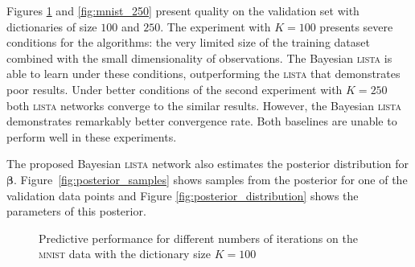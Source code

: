 \documentclass[letterpaper]{article}
\begin{document}
Figures \ref{fig:mnist_100} and \ref{fig:mnist_250} present quality on the validation set with dictionaries of size $100$ and $250$.  The experiment with $K=100$ presents severe conditions for the algorithms: the very limited size of the training dataset combined with the small dimensionality of observations. The Bayesian \textsc{lista} is able to learn under these conditions, outperforming the \textsc{lista} that demonstrates poor results. Under better conditions of the second experiment with $K=250$ both \textsc{lista} networks converge to the similar results. However, the Bayesian \textsc{lista} demonstrates remarkably better convergence rate. Both baselines are unable to perform well in these experiments.

The proposed Bayesian \textsc{lista} network also estimates the posterior distribution for $\boldsymbol\beta$. Figure~\ref{fig:posterior_samples} shows samples from the posterior for one of the validation data points and Figure \ref{fig:posterior_distribution} shows the parameters of this posterior.

\begin{figure}[t]
\centering
\caption{Predictive performance for different numbers of iterations on the \textsc{mnist} data with the dictionary size $K = 100$}
\label{fig:mnist_100}
\end{figure}
\end{document}
